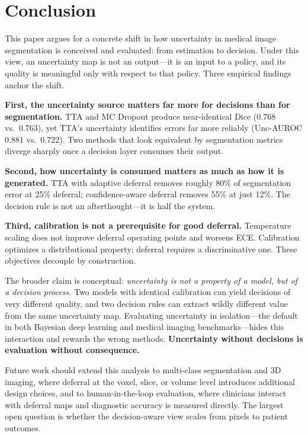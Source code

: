 \section{Conclusion}
\label{sec:conclusion}

This paper argues for a concrete shift in how uncertainty in medical image
segmentation is conceived and evaluated: from estimation to decision.
Under this view, an uncertainty map is not an output---it is an input to a
policy, and its quality is meaningful only with respect to that policy.
Three empirical findings anchor the shift.

\textbf{First, the uncertainty source matters far more for decisions than
for segmentation.} TTA and MC Dropout produce near-identical Dice
(0.768 vs.\ 0.763), yet TTA's uncertainty identifies errors far more
reliably (Unc-AUROC 0.881 vs.\ 0.722). Two methods that look equivalent
by segmentation metrics diverge sharply once a decision layer consumes
their output.

\textbf{Second, how uncertainty is consumed matters as much as how it is
generated.} TTA with adaptive deferral removes roughly 80\% of
segmentation error at 25\% deferral; confidence-aware deferral removes
55\% at just 12\%. The decision rule is not an afterthought---it is half
the system.

\textbf{Third, calibration is not a prerequisite for good deferral.}
Temperature scaling does not improve deferral operating points and
worsens ECE. Calibration optimizes a distributional property; deferral
requires a discriminative one. These objectives decouple by construction.

The broader claim is conceptual: \emph{uncertainty is not a property of a
model, but of a decision process.} Two models with identical calibration
can yield decisions of very different quality, and two decision rules can
extract wildly different value from the same uncertainty map. Evaluating
uncertainty in isolation---the default in both Bayesian deep learning and
medical imaging benchmarks---hides this interaction and rewards the wrong
methods. \textbf{Uncertainty without decisions is evaluation without
consequence.}

Future work should extend this analysis to multi-class segmentation and
3D imaging, where deferral at the voxel, slice, or volume level
introduces additional design choices, and to human-in-the-loop evaluation,
where clinicians interact with deferral maps and diagnostic accuracy is
measured directly. The largest open question is whether the decision-aware
view scales from pixels to patient outcomes.
